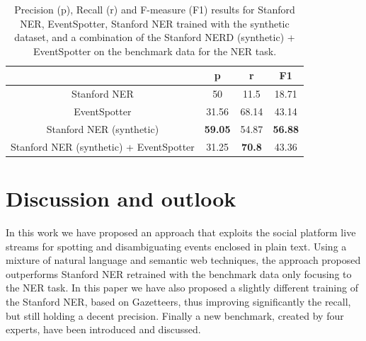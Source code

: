 \documentclass[10pt,a4paper]{article}
\begin{document}
\begin{table}[h]
\centering %
\begin{tabular}{c c c c} %
\hline %
& p & r & F1 \\ [0.5ex] %
\hline\hline %
Stanford NER & 50 & 11.5 & 18.71 \\
EventSpotter & 31.56 & 68.14 & 43.14 \\
\hline
Stanford NER (synthetic) & \textbf{59.05} & 54.87 & \textbf{56.88} \\
Stanford NER (synthetic) + EventSpotter & 31.25 & \textbf{70.8} & 43.36 \\
\hline %
\end{tabular}
\caption{Precision (p), Recall (r) and F-measure (F1) results for Stanford NER, EventSpotter, Stanford NER trained with the synthetic dataset, and a combination of the Stanford NERD (synthetic) + EventSpotter on the benchmark data for the NER task.} %
\label{tab:manual} %
\end{table}

\section{Discussion and outlook}
In this work we have proposed an approach that exploits the social platform live streams for spotting and disambiguating events enclosed in plain text. Using a mixture of natural language and semantic web techniques, the approach proposed outperforms Stanford NER retrained with the benchmark data only focusing to the NER task. In this paper we have also proposed a slightly different training of the Stanford NER, based on Gazetteers, thus improving significantly the recall, but still holding a decent precision. Finally a new benchmark, created by four experts, have been introduced and discussed. 
\end{document}
